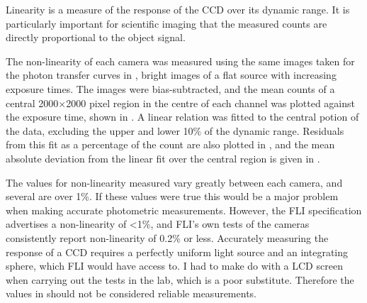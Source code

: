 \begin{colsection}
\begin{colsection}
Linearity is a measure of the response of the CCD over its dynamic range. It is particularly important for scientific imaging that the measured counts are directly proportional to the object signal.

The non-linearity of each camera was measured using the same images taken for the photon transfer curves in , bright images of a flat source with increasing exposure times. The images were bias-subtracted, and the mean counts of a central 2000$\times$2000 pixel region in the centre of each channel was plotted against the exposure time, shown in . A linear relation was fitted to the central potion of the data, excluding the upper and lower 10\% of the dynamic range. Residuals from this fit as a percentage of the count are also plotted in , and the mean absolute deviation from the linear fit over the central region is given in .

The values for non-linearity measured vary greatly between each camera, and several are over 1\%. If these values were true this would be a major problem when making accurate photometric measurements. However, the FLI specification advertises a non-linearity of <1\%, and FLI's own tests of the cameras consistently report non-linearity of 0.2\% or less. Accurately measuring the response of a CCD requires a perfectly uniform light source and an integrating sphere, which FLI would have access to. I had to make do with a LCD screen when carrying out the tests in the lab, which is a poor substitute. Therefore the values in  should not be considered reliable measurements.


\end{colsection}
\end{colsection}
